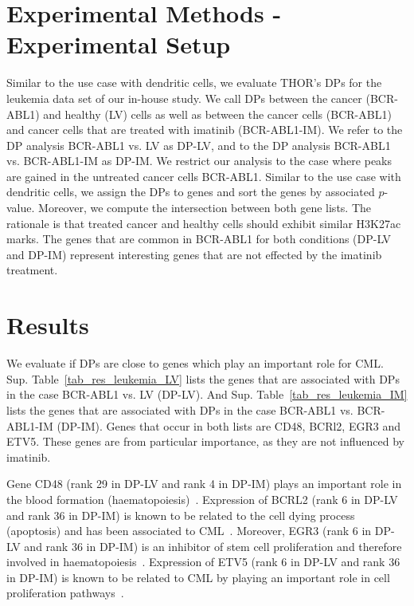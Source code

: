\section{Experimental Methods - Experimental Setup}
Similar to the use case with dendritic cells, we evaluate THOR's DPs for the leukemia data set of our in-house study.
We call DPs between the cancer (BCR-ABL1) and healthy (LV) cells as well as between the cancer cells (BCR-ABL1) and cancer cells that are treated with imatinib (BCR-ABL1-IM).
We refer to the DP analysis BCR-ABL1 vs. LV as DP-LV, and to the DP analysis BCR-ABL1 vs. BCR-ABL1-IM as DP-IM.
We restrict our analysis to the case where peaks are gained in the untreated cancer cells BCR-ABL1.
Similar to the use case with dendritic cells, we assign the DPs to genes and sort the genes by associated $p$-value.
Moreover, we compute the intersection between both gene lists.
The rationale is that treated cancer and healthy cells should exhibit similar H3K27ac marks.
The genes that are common in BCR-ABL1 for both conditions (DP-LV and DP-IM) represent interesting genes that are not effected by the imatinib treatment.

\section{Results}
We evaluate if DPs are close to genes which play an important role for CML. 
Sup. Table~\ref{tab_res_leukemia_LV} lists the genes that are associated with DPs in the case BCR-ABL1 vs. LV (DP-LV).
And Sup. Table~\ref{tab_res_leukemia_IM} lists the genes that are associated with DPs in the case BCR-ABL1 vs. BCR-ABL1-IM (DP-IM).
Genes that occur in both lists are CD48, BCRl2, EGR3 and ETV5.
These genes are from particular importance, as they are not influenced by imatinib.

Gene CD48 (rank 29 in DP-LV and rank 4 in DP-IM) plays an important role in the blood formation (haematopoiesis)~\citep{Zhang2012}.
Expression of BCRL2 (rank 6 in DP-LV and rank 36 in DP-IM) is known to be related to the cell dying process (apoptosis) and has been associated to CML~\citep{Nagy2003}.
Moreover, EGR3 (rank 6 in DP-LV and rank 36 in DP-IM) is an inhibitor of stem cell proliferation and therefore involved in haematopoiesis~\citep{Cheng2015}.
Expression of ETV5 (rank 6 in DP-LV and rank 36 in DP-IM) is known to be related to CML by playing an important role in cell proliferation pathways~\citep{DeSousa214}.





